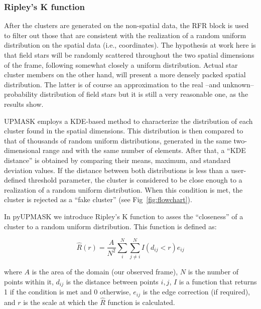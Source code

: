 \documentclass{aa}
\begin{document}
\subsubsection{Ripley's K function}
 \label{sssec:ripley}

 After the clusters are generated on the non-spatial data, the RFR block is
 used to filter out those that are consistent with the realization of a random
 uniform distribution on the spatial data (i.e., coordinates). The hypothesis
 at work here is that field stars will be randomly scattered throughout the
 two spatial dimensions of the frame, following somewhat closely a uniform
 distribution. Actual star cluster members on the other hand, will present a
 more densely packed spatial distribution.
 The latter is of course an approximation to the real --and unknown--
 probability distribution of field stars but it is still a very reasonable
 one, as the results show.

 UPMASK employs a KDE-based method to characterize the distribution of each
 cluster found in the spatial dimensions. This distribution is then compared
 to that of thousands of random uniform distributions, generated in the same
 two-dimensional range and with the same number of elements. After that,
 a ``KDE distance'' is obtained by comparing their means, maximum, and
 standard deviation values.
 If the distance between both distributions is less than a user-defined
 threshold parameter, the cluster is considered to be close enough to a
 realization of a random uniform distribution. When this condition is met, the
 cluster is rejected as a ``fake cluster'' (see Fig~\ref{fig:flowchart}).

 In pyUPMASK we introduce Ripley's K function \citep{ripley_1976,ripley_1979}
 to asses the ``closeness'' of a cluster to a random uniform distribution. This
 function is defined as:

 \begin{equation}
 \hat{R}(r) = \frac{A}{N^2} \sum_i^N \sum_{j\neq i}^N I(d_{ij} < r) e_{ij}
 \end{equation}

 \noindent where $A$ is the area of the domain (our observed frame), $N$ is
 the number of points within it, $d_{ij}$ is the distance between points
 $i,j$, $I$ is a function that returns 1 if the condition is met and 0
 otherwise, $e_{ij}$ is the edge correction (if required), and $r$ is the
 scale at which the $ \hat{R}$ function is calculated.
\end{document}

